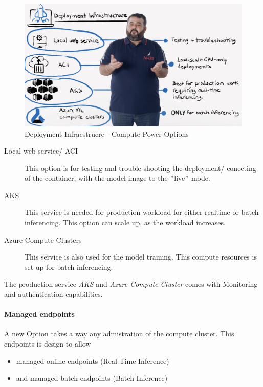 \begin{figure}[H]
	\centering	\includegraphics[scale = 0.2]{attachment/chapter_10/Scc016}
\caption{Deployment Infracstrucre - Compute Power Options}
\end{figure}
	

\begin{description}
	\item[Local web service/ \gls{ACI}] This option is for testing and trouble shooting the deployment/ conecting of the container, with the model image to the $"$live$"$ mode.
	\item[\gls{AKS}] This service is needed for production workload for either realtime or batch inferencing. This option can scale up, as the workload increases.
	\item[Azure Compute Clusters] This service is also used for the model training. This compute resources is set up for batch inferencing.
\end{description}

The production service \textit{AKS} and \textit{Azure Compute Cluster} comes with Monitoring and authentication capabilities. 

\paragraph{Managed endpoints}
A new Option takes a way any admistration of the compute cluster. This endpoints is design to allow 
\begin{itemize}
	\item managed online endpoints (Real-Time Inference)
	\item and managed batch endpoints (Batch Inference)
\end{itemize}

